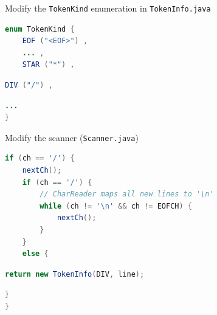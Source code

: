 \documentclass[8pt,a4paper,compress]{beamer}
\begin{document}
\begin{frame}[fragile]
\pause

Modify the \lstinline{TokenKind} enumeration in \lstinline{TokenInfo.java}

\begin{tcolorbox}[enhanced,drop shadow southwest,sharp corners,size=fbox,colback=white,fontlower=\small\ttfamily,collower=silver900]

\begin{lstlisting}[language=Java,style=focusin]
enum TokenKind {
    EOF ("<EOF>") ,
    ... ,
    STAR ("*") ,
\end{lstlisting}
\begin{lstlisting}[language=Java,style=focusin,backgroundcolor=\color{lime100}]
    DIV ("/") ,
\end{lstlisting}
\begin{lstlisting}[language=Java,style=focusin]
    ...
}
\end{lstlisting}
\end{tcolorbox}

\pause\bigskip

Modify the scanner (\lstinline{Scanner.java})

\begin{tcolorbox}[enhanced,drop shadow southwest,sharp corners,size=fbox,colback=white,fontlower=\small\ttfamily,collower=silver900]

\begin{lstlisting}[language=Java,style=focusin]
if (ch == '/') {
    nextCh();
    if (ch == '/') {
        // CharReader maps all new lines to '\n'
        while (ch != '\n' && ch != EOFCH) {
            nextCh();
        }
    }
    else {
\end{lstlisting}
\begin{lstlisting}[language=Java,style=focusin,backgroundcolor=\color{lime100}]
        return new TokenInfo(DIV, line);
\end{lstlisting}
\begin{lstlisting}[language=Java,style=focusin]
    }
}
\end{lstlisting}
\end{tcolorbox}
\end{frame}
\end{document}
